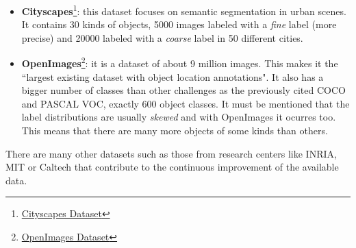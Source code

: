 \begin{itemize}
\item \textbf{Cityscapes}\footnote {\href{https://www.cityscapes-dataset.com/}{Cityscapes Dataset}}: this dataset focuses on semantic segmentation in urban scenes. It contains 30 kinds of objects, 5000 images labeled with a \textit{fine} label (more precise) and 20000 labeled with a \textit{coarse} label in 50 different cities.
\item \textbf{OpenImages}\footnote {\href{https://storage.googleapis.com/openimages/web/index.html}{OpenImages Dataset}}: it is a dataset of about 9 million images. This makes it the ``largest existing dataset with object location annotations". It also has a bigger number of classes than other challenges as the previously cited COCO and PASCAL VOC, exactly 600 object classes. It must be mentioned that the label distributions are usually \textit{skewed} and with OpenImages it ocurres too. This means that there are many more objects of some kinds than others.
\end{itemize}
There are many other datasets such as those from research centers like INRIA, MIT or Caltech that contribute to the continuous improvement of the available data.

